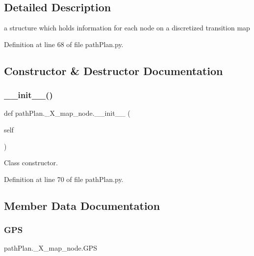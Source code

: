 \subsection{Detailed Description}
a structure which holds information for each node on a discretized transition map 

Definition at line 68 of file path\+Plan.\+py.



\subsection{Constructor \& Destructor Documentation}
\mbox{\label{classpath_plan_1_1___x__map__node_a73f6059a5ffe61cf3c79d9ac682ccf92}} 
\subsubsection{\texorpdfstring{\+\_\+\+\_\+init\+\_\+\+\_\+()}{\_\_init\_\_()}}
{\footnotesize\ttfamily def path\+Plan.\+\_\+\+X\+\_\+map\+\_\+node.\+\_\+\+\_\+init\+\_\+\+\_\+ (\begin{DoxyParamCaption}\item[{}]{self }\end{DoxyParamCaption})}



Class constructor. 



Definition at line 70 of file path\+Plan.\+py.



\subsection{Member Data Documentation}
\mbox{\label{classpath_plan_1_1___x__map__node_a4d104762b4f90c3b130ff6292732299d}} 
\subsubsection{\texorpdfstring{G\+PS}{GPS}}
{\footnotesize\ttfamily path\+Plan.\+\_\+\+X\+\_\+map\+\_\+node.\+G\+PS}



